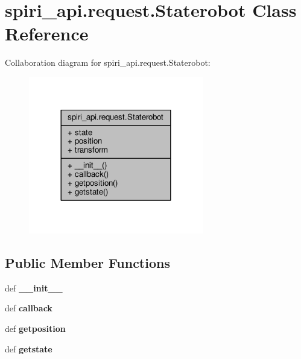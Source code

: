 \hypertarget{classspiri__api_1_1request_1_1_staterobot}{\section{spiri\-\_\-api.\-request.\-Staterobot Class Reference}
\label{classspiri__api_1_1request_1_1_staterobot}
}


Collaboration diagram for spiri\-\_\-api.\-request.\-Staterobot\-:
\nopagebreak
\begin{figure}[H]
\begin{center}
\leavevmode
\includegraphics[width=216pt]{classspiri__api_1_1request_1_1_staterobot__coll__graph}
\end{center}
\end{figure}
\subsection*{Public Member Functions}
\begin{DoxyCompactItemize}
\item 
\hypertarget{classspiri__api_1_1request_1_1_staterobot_ae3e81ac6540cda7ce41cb9ac687cbff6}{def {\bfseries \-\_\-\-\_\-init\-\_\-\-\_\-}}\label{classspiri__api_1_1request_1_1_staterobot_ae3e81ac6540cda7ce41cb9ac687cbff6}

\item 
\hypertarget{classspiri__api_1_1request_1_1_staterobot_a32dd4e20d07c24f5cb292b97088fa1a5}{def {\bfseries callback}}\label{classspiri__api_1_1request_1_1_staterobot_a32dd4e20d07c24f5cb292b97088fa1a5}

\item 
\hypertarget{classspiri__api_1_1request_1_1_staterobot_a7f6d68da682b75115591c6e3889b536e}{def {\bfseries getposition}}\label{classspiri__api_1_1request_1_1_staterobot_a7f6d68da682b75115591c6e3889b536e}

\item 
\hypertarget{classspiri__api_1_1request_1_1_staterobot_ac1be2cdb64902058e65bc90fafead524}{def {\bfseries getstate}}\label{classspiri__api_1_1request_1_1_staterobot_ac1be2cdb64902058e65bc90fafead524}

\end{DoxyCompactItemize}
